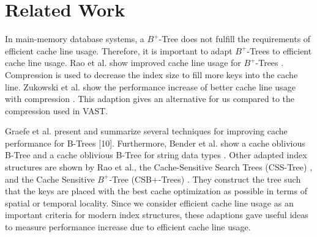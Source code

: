 \documentclass[conference]{IEEEtran}
\begin{document}


\section{Related Work}
In main-memory database systems, a $B^+$-Tree does not fulfill the requirements of efficient cache line usage. Therefore, it is important to adapt $B^+$-Trees to efficient cache line usage. Rao et al. show improved cache line usage for $B^+$-Trees \cite{b8}.  Compression is used to decrease the index size to fill more keys into the cache line. Zukowski et al. show the performance increase of better cache line usage with compression \cite{b9}. This adaption gives an alternative for us compared to the compression used in VAST.

Graefe et al. present and summarize several techniques for improving cache performance for B-Trees [10]. Furthermore,
Bender et al. show a cache oblivious B-Tree \cite{b11} and a cache oblivious B-Tree for string data types \cite{b12}. Other adapted index structures are shown by Rao et al., the Cache-Sensitive Search Trees (CSS-Tree) \cite{b8}, and the Cache Sensitive $B^+$-Tree (CSB+-Trees) \cite{b13}. They construct the tree such that the keys are placed with the best cache optimization as possible in terms of spatial or temporal locality. Since we consider efficient cache line usage as an important criteria for modern index structures, these adaptions gave useful ideas to measure performance increase due to efficient cache line usage. 
\end{document}

